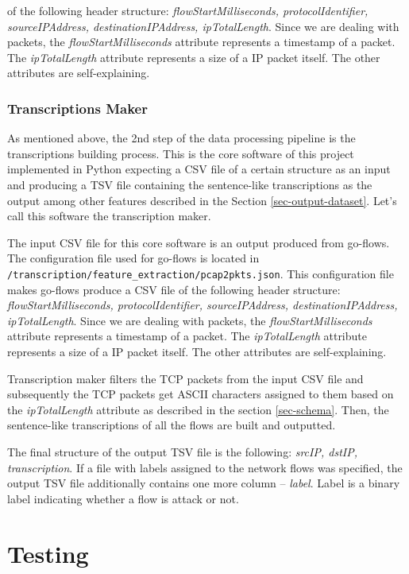 \documentclass{article}
\begin{document}
of the following header structure: \textit{flowStartMilliseconds, protocolIdentifier, sourceIPAddress, destinationIPAddress, ipTotalLength}. Since we are dealing with packets, the \textit{flowStartMilliseconds} attribute represents a timestamp of a packet. The \textit{ipTotalLength} attribute represents a size of a IP packet itself. The other attributes are self-explaining.


\subsubsection{Transcriptions Maker}
As mentioned above, the 2nd step of the data processing pipeline is the transcriptions building process. This is the core software of this project implemented in Python expecting a CSV file of a certain structure as an input and producing a TSV file containing the sentence-like transcriptions as the output among other features described in the Section \ref{sec-output-dataset}. Let's call this software the transcription maker.

The input CSV file for this core software is an output produced from go-flows. The configuration file used for go-flows is located in \verb|/transcription/feature_extraction/pcap2pkts.json|. This configuration file makes go-flows produce a CSV file of the following header structure: \textit{flowStartMilliseconds, protocolIdentifier, sourceIPAddress, destinationIPAddress, ipTotalLength}. Since we are dealing with packets, the \textit{flowStartMilliseconds} attribute represents a timestamp of a packet. The \textit{ipTotalLength} attribute represents a size of a IP packet itself. The other attributes are self-explaining.

Transcription maker filters the TCP packets from the input CSV file and subsequently the TCP packets get ASCII characters assigned to them based on the \textit{ipTotalLength} attribute as described in the section \ref{sec-schema}. Then, the sentence-like transcriptions of all the flows are built and outputted.

The final structure of the output TSV file is the following: \textit{srcIP, dstIP, transcription}. If a file with labels assigned to the network flows was specified, the output TSV file additionally contains one more column -- \textit{label}. Label is a binary label indicating whether a flow is attack or not.


\section{Testing}
\end{document}
